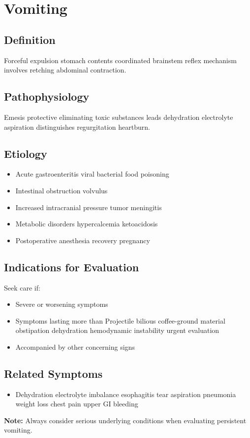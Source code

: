 \chapter{Vomiting}

\section*{Definition}
Forceful expulsion stomach contents coordinated brainstem reflex mechanism involves retching abdominal contraction.

\section*{Pathophysiology}
Emesis protective eliminating toxic substances leads dehydration electrolyte aspiration distinguishes regurgitation heartburn.

\section*{Etiology}
\begin{itemize}
  \item Acute gastroenteritis viral bacterial food poisoning
  \item Intestinal obstruction volvulus
  \item Increased intracranial pressure tumor meningitis
  \item Metabolic disorders hypercalcemia ketoacidosis
  \item Postoperative anesthesia recovery pregnancy
\end{itemize}

\section*{Indications for Evaluation}
Seek care if:
\begin{itemize}
  \item Severe or worsening symptoms
  \item Symptoms lasting more than Projectile bilious coffee-ground material obstipation dehydration hemodynamic instability urgent evaluation
  \item Accompanied by other concerning signs
\end{itemize}

\section*{Related Symptoms}
\begin{itemize}
  \item Dehydration electrolyte imbalance esophagitis tear aspiration pneumonia weight loss chest pain upper GI bleeding
\end{itemize}
\textbf{Note:} Always consider serious underlying conditions when evaluating persistent vomiting.

